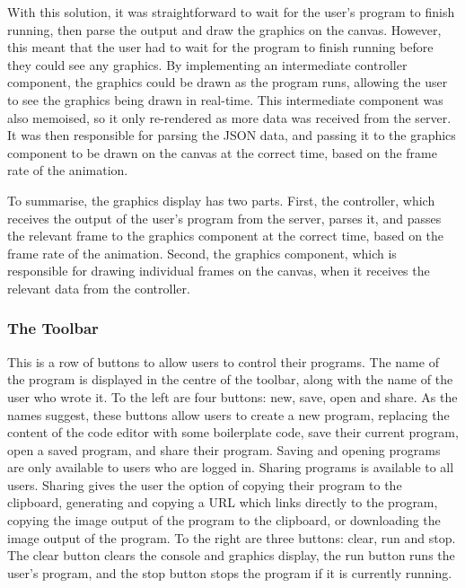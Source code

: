 \documentclass[../main.tex]{subfiles}
\begin{document}
                With this solution, it was straightforward to wait for the user's program to
                    finish running, then parse the output and draw the graphics on the canvas.
                However, this meant that the user had to wait for the program to finish running
                    before they could see any graphics.
                By implementing an intermediate controller component, the graphics could be
                    drawn as the program runs, allowing the user to see the graphics being drawn in
                    real-time.
                This intermediate component was also memoised, so it only re-rendered as more
                    data was received from the server.
                It was then responsible for parsing the JSON data, and passing it to the
                    graphics component to be drawn on the canvas at the correct time, based on the
                    frame rate of the animation.

                To summarise, the graphics display has two parts.
                First, the controller, which receives the output of the user's program from the
                    server, parses it, and passes the relevant frame to the graphics component at
                    the correct time, based on the frame rate of the animation.
                Second, the graphics component, which is responsible for drawing individual
                    frames on the canvas, when it receives the relevant data from the controller.

            \subsubsection{The Toolbar}
                This is a row of buttons to allow users to control their programs.
                The name of the program is displayed in the centre of the toolbar, along with
                    the name of the user who wrote it.
                To the left are four buttons: new, save, open and share.
                As the names suggest, these buttons allow users to create a new program,
                    replacing the content of the code editor with some boilerplate code, save their
                    current program, open a saved program, and share their program.
                Saving and opening programs are only available to users who are logged in.
                Sharing programs is available to all users.
                Sharing gives the user the option of copying their program to the clipboard,
                    generating and copying a URL which links directly to the program, copying the
                    image output of the program to the clipboard, or downloading the image output
                    of the program.
                To the right are three buttons: clear, run and stop.
                The clear button clears the console and graphics display, the run button runs
                    the user's program, and the stop button stops the program if it is currently
                    running.
\end{document}
